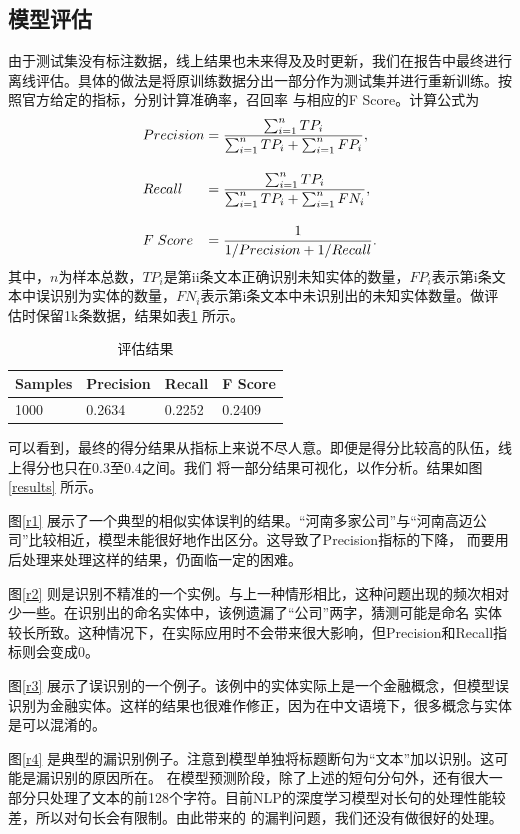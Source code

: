 \documentclass[11pt]{article}
\begin{document}
\subsection{模型评估}
由于测试集没有标注数据，线上结果也未来得及及时更新，我们在报告中最终进行离线评估。具体的做法是将原训练数据分出一部分作为测试集并进行重新训练。按照官方给定的指标，分别计算准确率，召回率%
与相应的F Score。计算公式为
\begin{equation*}
    \begin{array}{l @{\; = \;} l}
        Precision & \displaystyle \frac{\sum_{i=1}^n TP_i}{\sum_{i=1}^nTP_i + \sum_{i=1}^nFP_{i}}, \\[20pt]
        Recall & \displaystyle \frac{\sum_{i=1}^n TP_i}{\sum_{i=1}^nTP_i + \sum_{i=1}^nFN_{i}}, \\[20pt]
        F \; Score & \displaystyle \frac{1}{1/Precision + 1/Recall}.
    \end{array}
\end{equation*}
其中，$n$为样本总数，$TP_i$是第ii条文本正确识别未知实体的数量，$FP_i$表示第i条文本中误识别为实体的数量，$FN_i$表示第i条文本中未识别出的未知实体数量。做评估时保留1k条数据，结果如表\ref{result} 所示。

\tabcolsep=20pt
\begin{table}[!ht]
    \centering
    \begin{tabular}{l l l l}
        \toprule
        Samples & Precision & Recall & F Score \\ \midrule
        1000    & 0.2634    & 0.2252    &  0.2409\\
        \bottomrule
    \end{tabular}
    \caption{评估结果}
    \label{result}
\end{table}

可以看到，最终的得分结果从指标上来说不尽人意。即便是得分比较高的队伍，线上得分也只在$0.3$至$0.4$之间。我们%
将一部分结果可视化，以作分析。结果如图\ref{results} 所示。\par
图\ref{r1} 展示了一个典型的相似实体误判的结果。“河南多家公司”与“河南高迈公司”比较相近，模型未能很好地作出区分。这导致了Precision指标的下降，%
而要用后处理来处理这样的结果，仍面临一定的困难。\par
图\ref{r2} 则是识别不精准的一个实例。与上一种情形相比，这种问题出现的频次相对少一些。在识别出的命名实体中，该例遗漏了“公司”两字，猜测可能是命名%
实体较长所致。这种情况下，在实际应用时不会带来很大影响，但Precision和Recall指标则会变成0。\par
图\ref{r3} 展示了误识别的一个例子。该例中的实体实际上是一个金融概念，但模型误识别为金融实体。这样的结果也很难作修正，因为在中文语境下，很多概念与实体是可以混淆的。\par%
图\ref{r4} 是典型的漏识别例子。注意到模型单独将标题断句为“文本”加以识别。这可能是漏识别的原因所在。
在模型预测阶段，除了上述的短句分句外，还有很大一部分只处理了文本的前128个字符。目前NLP的深度学习模型对长句的处理性能较差，所以对句长会有限制。由此带来的%
的漏判问题，我们还没有做很好的处理。
\end{document}
